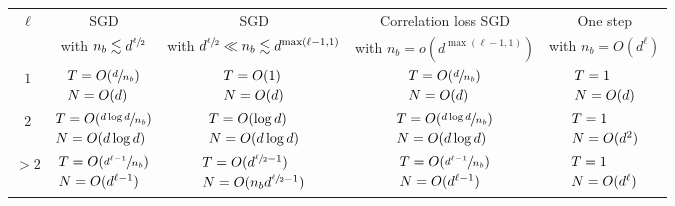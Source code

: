  \begin{table}
\begin{center}
\setlength{\tabcolsep}{5pt}
\setlength\extrarowheight{5pt}
\begin{tabular}{ccccc}
\toprule
  \multirow{2}{*}{$\ell$} & SGD & SGD & Correlation loss SGD & One step  \\
  &{\scriptsize with $n_b \lesssim d^{\sfrac{\ell}{2}}$} &{\scriptsize with $d^{\sfrac{\ell}{2}} \ll n_b \lesssim d^{{\rm max} (\ell-1,1)}$} &{\scriptsize with $n_b=o\left(d^{\max(\ell-1, 1)}\right)$} &{\scriptsize with $n_b = O(d^\ell)$} \\
\midrule
  $1$ & $\begin{array}{@{}l@{}} T = O(\sfrac{d}{n_b}) \\[2pt] N = O(d) \end{array}$ & $\begin{array}{@{}l@{}} T = O(1) \\[2pt] N = O(d) \end{array}$ & $\begin{array}{@{}l@{}} T = O(\sfrac{d}{n_b}) \\[2pt] N = O(d) \end{array}$ & $\begin{array}{@{}l@{}} T = 1 \\[2pt] N = O(d) \end{array}$ \\
  $2$ & $\begin{array}{@{}l@{}} T = O(\sfrac{d \log{d}}{n_b}) \\[2pt] N = O(d \log{d}) \end{array}$ & $\begin{array}{@{}l@{}} T = O(\log{d}) \\[2pt] N = O(d \log{d}) \end{array}$ & $\begin{array}{@{}l@{}} T = O(\sfrac{d\log{d}}{n_b}) \\[2pt] N = O(d \log{d}) \end{array}$ & $\begin{array}{@{}l@{}} T = 1 \\[2pt] N = O(d^2) \end{array}$ \\
 $>2$ & $\begin{array}{@{}l@{}} T = O(\sfrac{d^{\ell -1}}{n_b}) \\[2pt] N = O(d^{\ell-1}) \end{array}$ & $\begin{array}{@{}l@{}} T = O(d^{\sfrac{\ell}{2} - 1}) \\[2pt] N = O(n_b d^{\sfrac{\ell}{2} - 1}) \end{array}$ & $\begin{array}{@{}l@{}} T = O(\sfrac{d^{\ell-1}}{n_b}) \\[2pt] N = O(d^{\ell-1}) \end{array}$ & $\begin{array}{@{}l@{}} T = 1 \\[2pt] N = O(d^{\ell}) \end{array}$ \\

\end{tabular}
\end{center}
\end{table}

